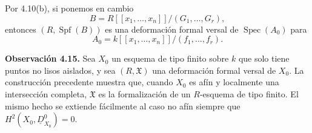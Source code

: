Por 4.10(b), si ponemos en cambio
\[
B=R[[x_1,\ldots,x_n]]/(G_1,\ldots,G_r),
\]
entonces $(R,\operatorname{Spf}(B))$ es una deformación formal versal
de $\operatorname{Spec}(A_0)$ para
\[
A_0=k[[x_1,\ldots,x_n]]/(f_1,\ldots,f_r).
\]

\medskip
\noindent\textbf{Observación 4.15.}
Sea $X_0$ un esquema de tipo finito sobre $k$ que solo tiene puntos
no lisos aislados, y sea $(R,\mathfrak X)$ una deformación formal
versal de $X_0$. La construcción precedente muestra que, cuando
$X_0$ es afín y localmente una intersección completa, $\mathfrak X$
es la formalización de un $R$-esquema de tipo finito. El mismo hecho
se extiende fácilmente al caso no afín siempre que
$H^2(X_0,\underline D^0_{X_0})=0$.
